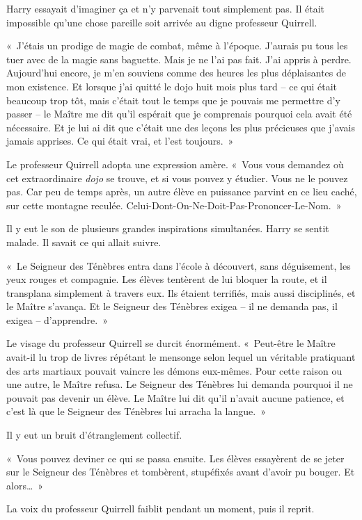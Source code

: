 Harry essayait d'imaginer ça et n'y parvenait tout simplement pas.
Il était impossible qu'une chose pareille soit arrivée au digne professeur Quirrell.

«~J'étais un prodige de magie de combat, même à l'époque.
J'aurais pu tous les tuer avec de la magie sans baguette.
Mais je ne l'ai pas fait.
J'ai appris à perdre.
Aujourd'hui encore, je m'en souviens comme des heures les plus déplaisantes de mon existence.
Et lorsque j'ai quitté le dojo huit mois plus tard -- ce qui était beaucoup trop tôt, mais c'était tout le temps que je pouvais me permettre d'y passer -- le Maître me dit qu'il espérait que je comprenais pourquoi cela avait été nécessaire.
Et je lui ai dit que c'était une des leçons les plus précieuses que j'avais jamais apprises.
Ce qui était vrai, et l'est toujours.~»

Le professeur Quirrell adopta une expression amère.
«~Vous vous demandez où cet extraordinaire \emph{dojo} se trouve, et si vous pouvez y étudier.
Vous ne le pouvez pas.
Car peu de temps après, un autre élève en puissance parvint en ce lieu caché, sur cette montagne reculée.
Celui-Dont-On-Ne-Doit-Pas-Prononcer-Le-Nom.~»

Il y eut le son de plusieurs grandes inspirations simultanées.
Harry se sentit malade.
Il savait ce qui allait suivre.

«~Le Seigneur des Ténèbres entra dans l'école à découvert, sans déguisement, les yeux rouges et compagnie.
Les élèves tentèrent de lui bloquer la route, et il transplana simplement à travers eux.
Ils étaient terrifiés, mais aussi disciplinés, et le Maître s'avança.
Et le Seigneur des Ténèbres exigea -- il ne demanda pas, il exigea -- d'apprendre.~»

Le visage du professeur Quirrell se durcit énormément.
«~Peut-être le Maître avait-il lu trop de livres répétant le mensonge selon lequel un véritable pratiquant des arts martiaux pouvait vaincre les démons eux-mêmes.
Pour cette raison ou une autre, le Maître refusa.
Le Seigneur des Ténèbres lui demanda pourquoi il ne pouvait pas devenir un élève.
Le Maître lui dit qu'il n'avait aucune patience, et c'est là que le Seigneur des Ténèbres lui arracha la langue.~»

Il y eut un bruit d'étranglement collectif.

«~Vous pouvez deviner ce qui se passa ensuite.
Les élèves essayèrent de se jeter sur le Seigneur des Ténèbres et tombèrent, stupéfixés avant d'avoir pu bouger.
Et alors…~»

La voix du professeur Quirrell faiblit pendant un moment, puis il reprit.

